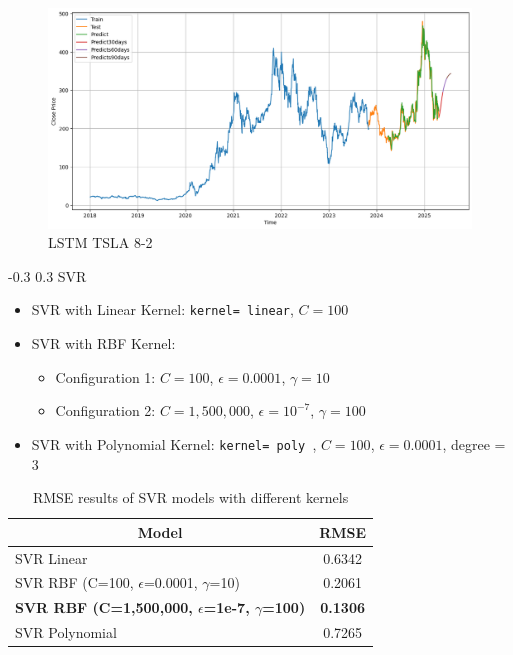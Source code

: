 \documentclass[twocolumn]{llncs}
\makeatletter
\renewcommand{\subsection}{\@startsection{subsection}{2}{\z@}%
  {-0.3\baselineskip}  %
  {0.3\baselineskip}   %
  {\normalfont\normalsize\bfseries}}
\makeatother
\begin{document}
\begin{figure}[H]
    \centering
    \includegraphics[width=1\linewidth]{LSTM_8_2.png}
    \caption{LSTM TSLA 8-2 }
    \label{fig:boxplot}
\end{figure}


\subsection{SVR}

\begin{itemize}
    \item SVR with Linear Kernel: \texttt{kernel= linear}, \( C = 100 \)
    \item SVR with RBF Kernel:
    \begin{itemize}
        \item Configuration 1: \( C = 100 \), \( \epsilon = 0.0001 \), \( \gamma = 10 \)
        \item Configuration 2: \( C = 1{,}500{,}000 \), \( \epsilon = 10^{-7} \), \( \gamma = 100 \)
    \end{itemize}
    \item SVR with Polynomial Kernel: \texttt{kernel= poly }, \( C = 100 \), \( \epsilon = 0.0001 \), degree = 3
\end{itemize}
\begin{table}[H]
    \centering
    \caption{RMSE results of SVR models with different kernels}
    \label{tab:svr_results}
    \begin{tabular}{|l|c|}
        \hline
        \multicolumn{1}{|c|}{\textbf{Model}} & \textbf{RMSE} \\
        \hline
        SVR Linear & 0.6342 \\
        SVR RBF (C=100, $\epsilon$=0.0001, $\gamma$=10) & 0.2061 \\
        \textbf{SVR RBF (C=1,500,000, $\epsilon$=1e-7, $\gamma$=100)} & \textbf{0.1306} \\
        SVR Polynomial & 0.7265 \\
        \hline
    \end{tabular}
\end{table}
\end{document}
